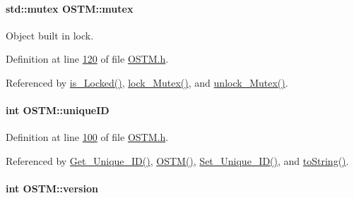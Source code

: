\paragraph[{\texorpdfstring{mutex}{mutex}}]{\setlength{\rightskip}{0pt plus 5cm}std\+::mutex O\+S\+T\+M\+::mutex\hspace{0.3cm}{\ttfamily [private]}}\hypertarget{class_o_s_t_m_aaab0921fd1564b793f882a5002ec7106_aaab0921fd1564b793f882a5002ec7106}{}\label{class_o_s_t_m_aaab0921fd1564b793f882a5002ec7106_aaab0921fd1564b793f882a5002ec7106}


Object built in lock. 



Definition at line \hyperlink{_o_s_t_m_8h_source_l00120}{120} of file \hyperlink{_o_s_t_m_8h_source}{O\+S\+T\+M.\+h}.



Referenced by \hyperlink{_o_s_t_m_8cpp_source_l00147}{is\+\_\+\+Locked()}, \hyperlink{_o_s_t_m_8cpp_source_l00133}{lock\+\_\+\+Mutex()}, and \hyperlink{_o_s_t_m_8cpp_source_l00140}{unlock\+\_\+\+Mutex()}.

\paragraph[{\texorpdfstring{unique\+ID}{uniqueID}}]{\setlength{\rightskip}{0pt plus 5cm}int O\+S\+T\+M\+::unique\+ID\hspace{0.3cm}{\ttfamily [private]}}\hypertarget{class_o_s_t_m_aa9fe59368b701af7f70befa23bd6901a_aa9fe59368b701af7f70befa23bd6901a}{}\label{class_o_s_t_m_aa9fe59368b701af7f70befa23bd6901a_aa9fe59368b701af7f70befa23bd6901a}


Definition at line \hyperlink{_o_s_t_m_8h_source_l00100}{100} of file \hyperlink{_o_s_t_m_8h_source}{O\+S\+T\+M.\+h}.



Referenced by \hyperlink{_o_s_t_m_8cpp_source_l00073}{Get\+\_\+\+Unique\+\_\+\+I\+D()}, \hyperlink{_o_s_t_m_8cpp_source_l00020}{O\+S\+T\+M()}, \hyperlink{_o_s_t_m_8cpp_source_l00066}{Set\+\_\+\+Unique\+\_\+\+I\+D()}, and \hyperlink{_o_s_t_m_8h_source_l00042}{to\+String()}.

\paragraph[{\texorpdfstring{version}{version}}]{\setlength{\rightskip}{0pt plus 5cm}int O\+S\+T\+M\+::version\hspace{0.3cm}{\ttfamily [private]}}\hypertarget{class_o_s_t_m_a9a6ea36181be2db7f9082d77956511d7_a9a6ea36181be2db7f9082d77956511d7}{}\label{class_o_s_t_m_a9a6ea36181be2db7f9082d77956511d7_a9a6ea36181be2db7f9082d77956511d7}


